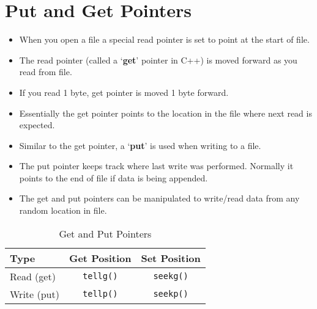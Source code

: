 \documentclass[12pt,a4paper]{article}
\begin{document}
\section{Put and Get Pointers}
\begin{itemize}
\item When you open a file a special read pointer is set to point at the start of file.
\item The read pointer (called a `\textbf{get}' pointer in C++) is moved forward as you read from file.
\item If you read 1 byte, get pointer is moved 1 byte forward.
\item Essentially the get pointer points to the location in the file where next read is expected.
\item Similar to the get pointer, a `\textbf{put}' is used when writing to a file.
\item The put pointer keeps track where last write was performed. Normally it points to the end of file if data is being appended.
\item The get and put pointers can be manipulated to write/read data from any random location in file.
\end{itemize}
\begin{table}[H]
\begin{center}
\vspace{0.3cm}
	\begin{tabular}{lcc}
	\hline \hline
		\textbf{Type} \rule{0pt}{2.6ex} & \textbf{Get Position} & \textbf{Set Position}\\
		\hline
		Read (get)\rule{0pt}{2.6ex} &  \verb|tellg()| & \verb|seekg()|\\
		Write (put)\rule{0pt}{2.6ex} & \verb|tellp()| & \verb|seekp()|\\
	\hline \hline
	\end{tabular}
\end{center}
\label{GetandPutPointers}
\caption{Get and Put Pointers}
\end{table}
\end{document}
